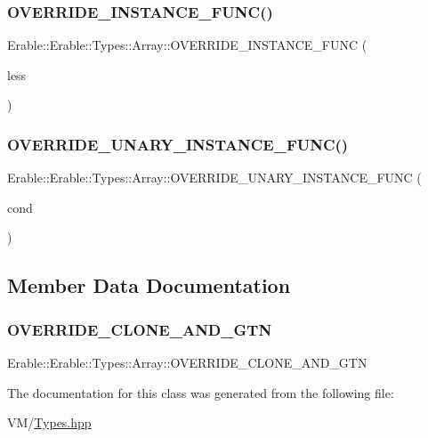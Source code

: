 \subsubsection{\texorpdfstring{OVERRIDE\_INSTANCE\_FUNC()}{OVERRIDE\_INSTANCE\_FUNC()}\hspace{0.1cm}{\footnotesize\ttfamily [4/4]}}
{\footnotesize\ttfamily Erable\+::\+Erable\+::\+Types\+::\+Array\+::\+O\+V\+E\+R\+R\+I\+D\+E\+\_\+\+I\+N\+S\+T\+A\+N\+C\+E\+\_\+\+F\+U\+NC (\begin{DoxyParamCaption}\item[{less}]{ }\end{DoxyParamCaption})}

\mbox{\label{class_erable_1_1_erable_1_1_types_1_1_array_a300cc43085ff949a3fb7f69099373487}} 
\subsubsection{\texorpdfstring{OVERRIDE\_UNARY\_INSTANCE\_FUNC()}{OVERRIDE\_UNARY\_INSTANCE\_FUNC()}}
{\footnotesize\ttfamily Erable\+::\+Erable\+::\+Types\+::\+Array\+::\+O\+V\+E\+R\+R\+I\+D\+E\+\_\+\+U\+N\+A\+R\+Y\+\_\+\+I\+N\+S\+T\+A\+N\+C\+E\+\_\+\+F\+U\+NC (\begin{DoxyParamCaption}\item[{cond}]{ }\end{DoxyParamCaption})}



\subsection{Member Data Documentation}
\mbox{\label{class_erable_1_1_erable_1_1_types_1_1_array_ac0aa982c038f07ce843551be2e6f52ac}} 
\subsubsection{\texorpdfstring{OVERRIDE\_CLONE\_AND\_GTN}{OVERRIDE\_CLONE\_AND\_GTN}}
{\footnotesize\ttfamily Erable\+::\+Erable\+::\+Types\+::\+Array\+::\+O\+V\+E\+R\+R\+I\+D\+E\+\_\+\+C\+L\+O\+N\+E\+\_\+\+A\+N\+D\+\_\+\+G\+TN}



The documentation for this class was generated from the following file\+:\begin{DoxyCompactItemize}
\item 
V\+M/\mbox{\hyperlink{_types_8hpp}{Types.\+hpp}}\end{DoxyCompactItemize}
